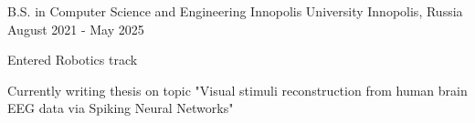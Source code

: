 

\begin{cventries}

  \cventry
    {B.S. in Computer Science and Engineering} %
    {Innopolis University} %
    {Innopolis, Russia} %
    {August 2021 - May 2025} %
    {
      \begin{cvitems} %
        \item {Entered Robotics track}
        \item {Currently writing thesis on topic "Visual stimuli reconstruction from human brain EEG data via Spiking Neural Networks"}
      \end{cvitems}
    }

\end{cventries}
